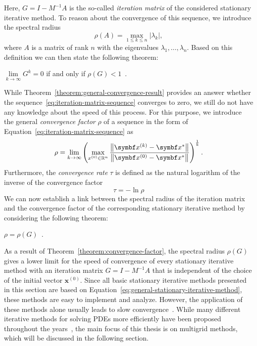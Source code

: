 Here, $G = I - M^{-1} A$ is the so-called \emph{iteration matrix} of the considered stationary iterative method.
To reason about the convergence of this sequence, we introduce the spectral radius 
\begin{equation}
	\rho (A)=\max \limits_{1 \leq k \leq n} |\lambda _{k}|,
\end{equation}
where $A$ is a matrix of rank $n$ with the eigenvalues $\lambda_{1}, \dots, \lambda_{n}$.
Based on this definition we can then state the following theorem:
\begin{theorem}
$\lim \limits_{k \to  \infty} G^k = 0$ if and only if $\rho(G) < 1$~\cite{varga1962iterative,saad2003iterative}.
\label{theorem:general-convergence-result}
\end{theorem}

While Theorem~\ref{theorem:general-convergence-result} provides an answer whether the sequence~\eqref{eq:iteration-matrix-sequence} converges to zero, we still do not have any knowledge about the speed of this process.
For this purpose, we introduce the general \emph{convergence factor} $\rho$ of a sequence in the form of Equation~\eqref{eq:iteration-matrix-sequence} as
\begin{equation}
	\rho = \lim \limits_{k \to  \infty} \left( \max \limits_{x^{(0)} \in \mathbb{R}^{n}} \frac{\norm{\bm{x}^{(k)} - \bm{x}^{*}}}{\norm{\bm{x}^{(0)} - \bm{x}^{*}}} \right)^{\frac{1}{k}}.
\end{equation} 
Furthermore, the \emph{convergence rate} $\tau$ is defined as the natural logarithm of the inverse of the convergence factor
\begin{equation}
	\tau = -\ln \rho
\end{equation}
We can now establish a link between the spectral radius of the iteration matrix and the convergence factor of the corresponding stationary iterative method by considering the following theorem:  
\begin{theorem}
	$\rho = \rho(G)$~\cite{varga1962iterative,saad2003iterative}.
	\label{theorem:convergence-factor}
\end{theorem}

As a result of Theorem~\ref{theorem:convergence-factor}, the spectral radius $\rho(G)$ gives a lower limit for the speed of convergence of every stationary iterative method with an iteration matrix $G = I - M^{-1} A$ that is independent of the choice of the initial vector $\bm{x}^{(0)}$.
Since all basic stationary iterative methods presented in this section are based on Equation~\eqref{eq:general-stationary-iterative-method}, these methods are easy to implement and analyze.
However, the application of these methods alone usually leads to slow convergence~\cite{briggs2000multigrid}.
While many different iterative methods for solving PDEs more efficiently have been proposed throughout the years~\cite{saad2003iterative}, the main focus of this thesis is on multigrid methods, which will be discussed in the following section.


